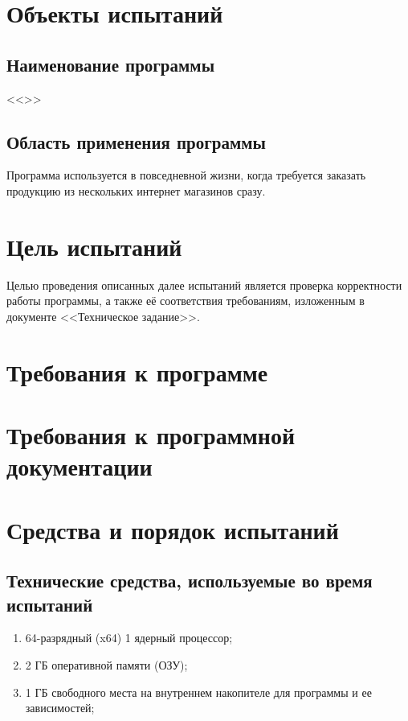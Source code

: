 \section{Объекты испытаний}
\subsection{Наименование программы}
<<\CRTname>>

\subsection{Область применения программы}
Программа используется в повседневной жизни, когда требуется заказать продукцию из нескольких интернет магазинов сразу.

\section{Цель испытаний}
Целью проведения описанных далее испытаний является проверка корректности работы программы,
а также её соответствия требованиям, изложенным в документе <<Техническое задание>>.

\section{Требования к программе}
\section{Требования к программной документации}

\section{Средства и порядок испытаний}
\subsection{Технические средства, используемые во время испытаний}
\begin{enumerate}
  \item 64-разрядный (x64) 1 ядерный процессор;
  \item 2 ГБ оперативной памяти (ОЗУ);
  \item 1 ГБ свободного места на внутреннем накопителе для программы и ее зависимостей;
\end{enumerate}
